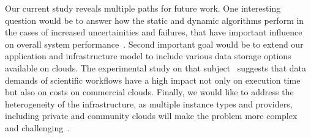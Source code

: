 \documentclass{sig-alternate}
\begin{document}
Our current study reveals multiple paths for future work. One interesting
question would be to answer how the static and dynamic algorithms perform in the
cases of increased uncertainities and failures, that have important influence
on overall system performance~\cite{Sakellariou2010,Dongarra2007}. Second
important goal would be to extend our application and infrastructure model to
include various data storage options available on clouds. The experimental study
on that subject~\cite{Juve2010} suggests that data demands of scientific
workflows have a high impact not only on execution time but also on costs on
commercial clouds. Finally, we would like to address the heterogeneity of the
infrastructure, as multiple instance types and providers, including private
and community clouds will make the problem more complex and
challenging~\cite{Marshall2010,vockler11,Juve2010}.







\end{document}
